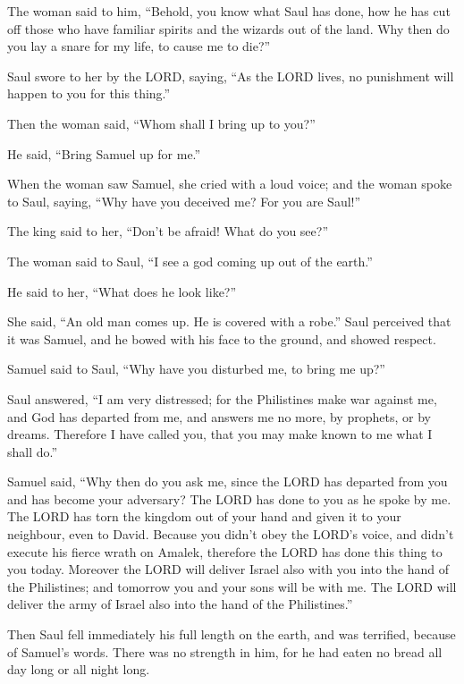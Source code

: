 The woman said to him, ``Behold, you know what Saul has
done, how he has cut off those who have familiar spirits and the wizards
out of the land. Why then do you lay a snare for my life, to cause me to
die?''

 Saul swore to her by the LORD, saying, ``As the LORD
lives, no punishment will happen to you for this thing.''

 Then the woman said, ``Whom shall I bring up to you?''

He said, ``Bring Samuel up for me.''

 When the woman saw Samuel, she cried with a loud voice;
and the woman spoke to Saul, saying, ``Why have you deceived me? For you
are Saul!''

 The king said to her, ``Don't be afraid! What do you
see?''

The woman said to Saul, ``I see a god coming up out of the earth.''

 He said to her, ``What does he look like?''

She said, ``An old man comes up. He is covered with a robe.'' Saul
perceived that it was Samuel, and he bowed with his face to the ground,
and showed respect.

 Samuel said to Saul, ``Why have you disturbed me, to
bring me up?''

Saul answered, ``I am very distressed; for the Philistines make war
against me, and God has departed from me, and answers me no more, by
prophets, or by dreams. Therefore I have called you, that you may make
known to me what I shall do.''

 Samuel said, ``Why then do you ask me, since the LORD
has departed from you and has become your adversary?  The
LORD has done to you as he spoke by me. The LORD has torn the kingdom
out of your hand and given it to your neighbour, even to David.
 Because you didn't obey the LORD's voice, and didn't
execute his fierce wrath on Amalek, therefore the LORD has done this
thing to you today.  Moreover the LORD will deliver
Israel also with you into the hand of the Philistines; and tomorrow you
and your sons will be with me. The LORD will deliver the army of Israel
also into the hand of the Philistines.''

 Then Saul fell immediately his full length on the earth,
and was terrified, because of Samuel's words. There was no strength in
him, for he had eaten no bread all day long or all night long.

